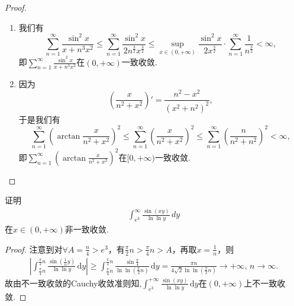 \documentclass[../../main.tex]{subfiles}%
\begin{document}
\begin{proof}
\begin{enumerate}
\item 我们有
\[
\sum_{n=1}^{\infty} \frac{\sin^2 x}{x + n^3 x^2} \leqslant \sum_{n=1}^{\infty} \frac{\sin^2 x}{2n^{\frac{3}{2}} x^{\frac{3}{2}}} \leqslant \sup_{x \in (0, +\infty)} \frac{\sin^2 x}{2x^{\frac{3}{2}}} \cdot \sum_{n=1}^{\infty} \frac{1}{n^{\frac{3}{2}}} < \infty,
\]
即\(\sum_{n=1}^{\infty} \frac{\sin^2 x}{x + n^3 x^2}\)在\((0, +\infty)\)一致收敛.

\item 因为
\[
\left( \frac{x}{n^2 + x^2} \right)' = \frac{n^2 - x^2}{(x^2 + n^2)^2},
\]
于是我们有
\[
\sum_{n=1}^{\infty} \left( \arctan \frac{x}{n^2 + x^2} \right)^2 \leqslant \sum_{n=1}^{\infty} \left( \frac{x}{n^2 + x^2} \right)^2 \leqslant \sum_{n=1}^{\infty} \left( \frac{n}{n^2 + n^2} \right)^2 < \infty,
\]
即\(\sum_{n=1}^{\infty} \left( \arctan \frac{x}{n^2 + x^2} \right)^2\)在\([0, +\infty)\)一致收敛.
\end{enumerate}

\end{proof}

\begin{example}
证明
\begin{align*}
\int_{e^3}^{\infty} \frac{\sin(xy)}{\ln \ln y} \, dy
\end{align*}
在$x \in (0, +\infty)$非一致收敛.
\end{example}
\begin{proof}

注意到对$\forall A= \frac{n}{4}>e^3$，有$\frac{\pi}{2}n>\frac{\pi}{4}n>A$，再取$x=\frac{1}{n}$，则
\begin{align*}
\left| \int_{\frac{\pi}{4}n}^{\frac{\pi}{2}n} \frac{\sin \left( \frac{1}{n}y \right)}{\ln\ln y} \,\mathrm{d}y \right| \geqslant \int_{\frac{\pi}{4}n}^{\frac{\pi}{2}n} \frac{\sin \frac{\pi}{4}}{\ln\ln \left( \frac{\pi}{2}n \right)} \,\mathrm{d}y = \frac{\pi n}{4\sqrt{2}\ln\ln \left( \frac{\pi}{2}n \right)} \rightarrow +\infty,\,n\rightarrow \infty.
\end{align*}
故由不一致收敛的Cauchy收敛准则知,$\int_{e^3}^{+\infty} \frac{\sin \left( xy \right)}{\ln\ln y} \,\mathrm{d}y$在$\left( 0,+\infty \right)$上不一致收敛.

\end{proof}
\end{document}
